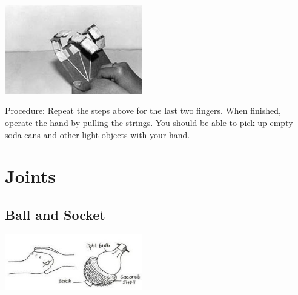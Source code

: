 \begin{multicols}{2}
\begin{center}
\includegraphics[width=0.45\textwidth]{./img/robotic-hand-final.jpg}
\end{center}

\begin{description*}
\item[Procedure:]{Repeat the steps above for the last two fingers. When finished, operate the hand by pulling the strings. You should be able to pick up empty soda cans and other light objects with your hand.}
\end{description*}


\section*{Joints}


\subsection{Ball and Socket}

\begin{center}
\includegraphics[width=0.45\textwidth]{./img/vso/ball-socket.jpg}
\end{center}


\end{multicols}

